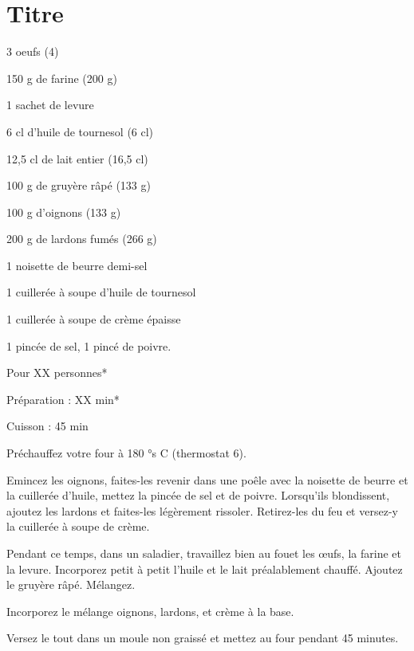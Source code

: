\section{Titre}

\begin{ingredients}
\item 3 oeufs (4)
\item 150 g de farine (200 g)
\item 1 sachet de levure
\item 6 cl d’huile de tournesol (6 cl)
\item 12,5 cl de lait entier (16,5 cl)
\item 100 g de gruyère râpé (133 g)
\item 100 g d’oignons (133 g)
\item 200 g de lardons fumés (266 g)
\item 1 noisette de beurre demi-sel
\item 1 cuillerée à soupe d’huile de tournesol
\item 1 cuillerée à soupe de crème épaisse
\item 1 pincée de sel, 1 pincé de poivre.
\end{ingredients}
\begin{infos}
\item Pour XX personnes*		%
\item Préparation : XX min*		%
\item Cuisson : 45 min			%
\end{infos}
\begin{etapes}
\item Préchauffez votre four à 180 °s C (thermostat 6).  
\item Emincez les oignons, faites-les revenir dans une poêle avec la noisette de beurre et la cuillerée d’huile, mettez la pincée de sel et de poivre. Lorsqu’ils blondissent, ajoutez les lardons et faites-les légèrement rissoler. Retirez-les du feu et versez-y la cuillerée à soupe de crème.
\item Pendant ce temps, dans un saladier, travaillez bien au fouet les œufs, la farine et la levure. Incorporez petit à petit l’huile et le lait préalablement chauffé. Ajoutez le gruyère râpé. Mélangez.
\item Incorporez le mélange oignons, lardons, et crème à la base.
\item Versez le tout dans un moule non graissé et mettez au four pendant 45 minutes.
\end{etapes}
\begin{conseils}
\end{conseils}
